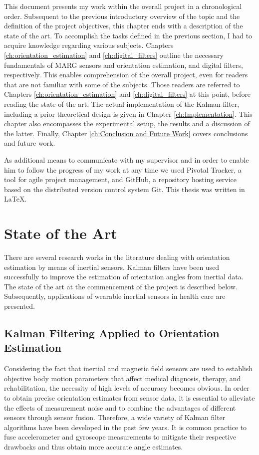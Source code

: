 This document presents my work within the overall project in a chronological order. Subsequent to the previous introductory overview of the topic and the definition of the project objectives, this chapter ends with a description of the state of the art. To accomplish the tasks defined in the previous section, I had to acquire knowledge regarding various subjects. Chapters \ref{ch:orientation_estimation} and \ref{ch:digital_filters} outline the necessary fundamentals of MARG sensors and orientation estimation, and digital filters, respectively. This enables comprehension of the overall project, even for readers that are not familiar with some of the subjects. Those readers are referred to Chapters \ref{ch:orientation_estimation} and \ref{ch:digital_filters} at this point, before reading the state of the art. The actual implementation of the Kalman filter, including a prior theoretical design is given in Chapter \ref{ch:Implementation}. This chapter also encompasses the experimental setup, the results and a discussion of the latter. Finally, Chapter \ref{ch:Conclusion and Future Work} covers conclusions and future work.

As additional means to communicate with my supervisor and in order to enable him to follow the progress of my work at any time we used Pivotal Tracker, a tool for agile project management, and GitHub, a repository hosting service based on the distributed version control system Git. This thesis was written in \LaTeX{}.
 
\section{State of the Art}\label{sec:state_of_the_art}

There are several research works in the literature dealing with orientation estimation by means of inertial sensors. Kalman filters have been used successfully to improve the estimation of orientation angles from inertial data. The state of the art at the commencement of the project is described below. Subsequently, applications of wearable inertial sensors in health care are presented.

\subsection{Kalman Filtering Applied to Orientation Estimation} \label{sec:state_of_the_art_kalman}

Considering the fact that inertial and magnetic field sensors are used to establish objective body motion parameters that affect medical diagnosis, therapy, and rehabilitation, the necessity of high levels of accuracy becomes obvious. In order to obtain precise orientation estimates from sensor data, it is essential to alleviate the effects of measurement noise and to combine the advantages of different  sensors through sensor fusion. Therefore, a wide variety of Kalman filter algorithms have been developed in the past few years. It is common practice to fuse accelerometer and gyroscope measurements to mitigate their respective drawbacks and thus obtain more accurate angle estimates.

